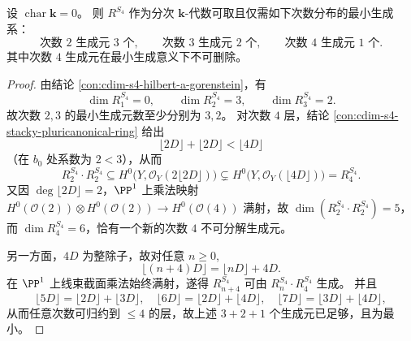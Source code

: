 \begin{conclusion}[最小代数生成中的四次不可约层]\label{con:cdim-s4-minimal-generators-degree-profile}
设 \(\operatorname{char}\mathbf k=0\)。
则 \(R^{S_4}\) 作为分次 \(\mathbf k\)-代数可取且仅需如下次数分布的最小生成系：
\[
\text{次数 }2\text{ 生成元 }3\text{ 个},\qquad
\text{次数 }3\text{ 生成元 }2\text{ 个},\qquad
\text{次数 }4\text{ 生成元 }1\text{ 个}.
\]
其中次数 \(4\) 生成元在最小生成意义下不可删除。
\end{conclusion}
\begin{proof}
由结论 \ref{con:cdim-s4-hilbert-a-gorenstein}，有
\[
\dim R^{S_4}_1=0,\qquad
\dim R^{S_4}_2=3,\qquad
\dim R^{S_4}_3=2.
\]
故次数 \(2,3\) 的最小生成元数至少分别为 \(3,2\)。
对次数 \(4\) 层，结论 \ref{con:cdim-s4-stacky-pluricanonical-ring} 给出
\[
\lfloor 2D\rfloor+\lfloor 2D\rfloor<\lfloor 4D\rfloor
\]
（在 \(b_0\) 处系数为 \(2<3\)），从而
\[
R^{S_4}_2\cdot R^{S_4}_2
\subseteq
H^0\!\bigl(Y,\mathcal O_Y(2\lfloor 2D\rfloor)\bigr)
\subsetneq
H^0\!\bigl(Y,\mathcal O_Y(\lfloor 4D\rfloor)\bigr)=R^{S_4}_4.
\]
又因 \(\deg\lfloor2D\rfloor=2\)，\(\PP^1\) 上乘法映射
\(
H^0(\mathcal O(2))\otimes H^0(\mathcal O(2))\to H^0(\mathcal O(4))
\)
满射，故 \(\dim(R^{S_4}_2\cdot R^{S_4}_2)=5\)，而 \(\dim R^{S_4}_4=6\)，恰有一个新的次数 \(4\) 不可分解生成元。

另一方面，\(4D\) 为整除子，故对任意 \(n\ge0\),
\[
\lfloor(n+4)D\rfloor=\lfloor nD\rfloor+4D.
\]
在 \(\PP^1\) 上线束截面乘法始终满射，遂得 \(R^{S_4}_{n+4}\) 可由 \(R^{S_4}_n\cdot R^{S_4}_4\) 生成。
并且
\[
\lfloor5D\rfloor=\lfloor2D\rfloor+\lfloor3D\rfloor,\quad
\lfloor6D\rfloor=\lfloor2D\rfloor+\lfloor4D\rfloor,\quad
\lfloor7D\rfloor=\lfloor3D\rfloor+\lfloor4D\rfloor,
\]
从而任意次数可归约到 \(\le4\) 的层，故上述 \(3+2+1\) 个生成元已足够，且为最小。
\end{proof}

